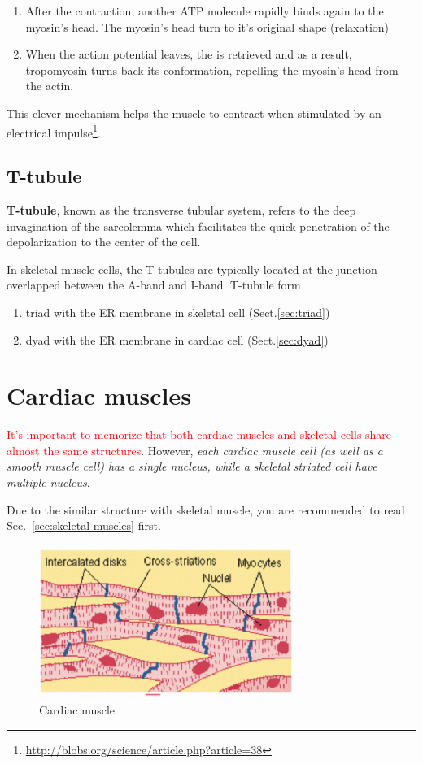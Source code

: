 \begin{enumerate}
\item After the contraction, another ATP molecule rapidly binds again to the
  myosin's head. The myosin's head turn to it's original shape (relaxation)

\item When the action potential leaves, the  is retrieved
  and as a result, tropomyosin turns back its conformation, repelling
  the myosin's head from the actin.
\end{enumerate}
This clever mechanism helps the muscle to contract when stimulated by
an electrical impulse\footnote{\url{http://blobs.org/science/article.php?article=38}}. 



\subsection{T-tubule}
\label{sec:t-tubule}

{\bf T-tubule}, known as the transverse tubular system, refers to the
deep invagination of the sarcolemma which facilitates the quick
penetration of the depolarization to the center of the cell. 

In skeletal muscle cells, the T-tubules are typically located at the
junction overlapped between the A-band and I-band. 
T-tubule form 
\begin{enumerate}
  \item triad with the ER membrane in skeletal cell (Sect.\ref{sec:triad})
  
  \item dyad with the ER membrane in cardiac cell (Sect.\ref{sec:dyad})
\end{enumerate}



\section{Cardiac muscles}
\label{sec:cardiac-muscles}

\textcolor{red}{It's important to memorize that both cardiac muscles and
skeletal cells share almost the same structures}. However,
{\it each cardiac muscle cell (as well as a smooth muscle cell) has a
single nucleus, while a skeletal striated cell have multiple nucleus}.
  
Due to the similar structure with skeletal muscle, you are recommended to read
Sec.~\ref{sec:skeletal-muscles} first.
\begin{figure}[hbt]
 \centerline{\includegraphics[height=5cm]{./images/cardiac_muscle.eps}}
\caption{Cardiac muscle}
\label{fig:cardiac_muscle}
\end{figure}

